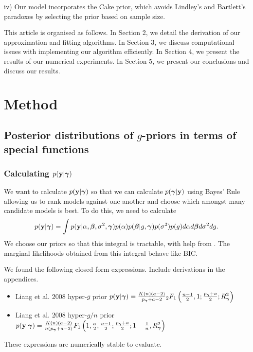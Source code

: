 iv) Our model incorporates the Cake prior, which avoids Lindley's and Bartlett's paradoxes by selecting the
prior based on sample size.

This article is organised as follows. In Section 2, we detail the derivation of our approximation and fitting
algorithms. In Section 3, we discuss computational issues with implementing our algorithm efficiently. In
Section 4, we present the results of our numerical experiments. In Section 5, we present our conclusions and
discuss our results.

\section{Method}

\subsection{Posterior distributions of $g$-priors in terms of special functions}


\subsubsection{Calculating $p({\bf y} | {\boldsymbol \gamma})$}
We want to calculate $p({\bf y} | {\boldsymbol \gamma})$ so that we can calculate $p({\boldsymbol \gamma} | {\bf y})$ using Bayes' Rule 
allowing us to rank models against one another and choose which amongst many candidate models is best.
To do this, we need to calculate
$$p({\bf y} | {\boldsymbol \gamma}) = \int p({\bf y} | \alpha, {\boldsymbol \beta}, \sigma^2, {\boldsymbol \gamma}) p(\alpha) p({\boldsymbol \beta} | g, {\boldsymbol \gamma}) p(\sigma^2) p(g) d \alpha d {\boldsymbol \beta} d \sigma^2 d g.$$
We choose our priors so that this integral is tractable, with help from \cite{Gradshteyn1988}.
The marginal likelihoods obtained from this integral behave like BIC.

We found the following closed form expressions. Include derivations in the appendices.
\small
\begin{itemize}
	\item Liang et al. 2008 hyper-$g$ prior \cite{Liang2008}
		$p({\bf y} | {\boldsymbol \gamma}) = \frac{K(n) (a - 2)}{p_{\boldsymbol \gamma} + a  - 2} {}_2 F_1 \left( \frac{n-1}{2}, 1; \frac{p_{\boldsymbol \gamma} + a}{2}; R_{\boldsymbol \gamma}^2 \right)$
	\item Liang et al. 2008 hyper-$g/n$ prior \cite{Liang2008}
		$p({\bf y} | {\boldsymbol \gamma}) = \frac{K(n) (a - 2)}{n (p_{\boldsymbol \gamma} + a  - 2)} F_1 \left( 1, \frac{a}{2}, \frac{n-1}{2}; \frac{p_{\boldsymbol \gamma} + a}{2}; 1 - \frac{1}{n}, R_{\boldsymbol \gamma}^2 \right)$
\end{itemize}
These expressions are numerically stable to evaluate.

